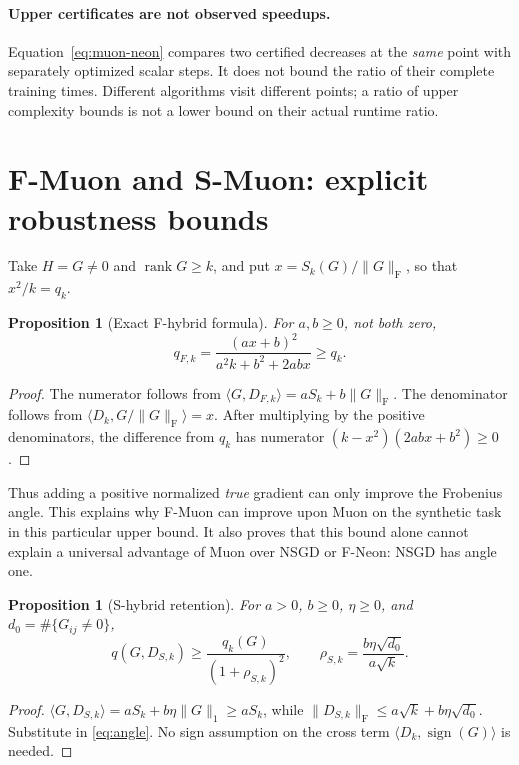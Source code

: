 \documentclass[11pt]{article}
\newtheorem{proposition}[theorem]{Proposition}
\newcommand{\ip}[2]{\langle #1,#2\rangle}
\newcommand{\F}[1]{\lVert #1\rVert_{\mathrm F}}
\newcommand{\ent}[1]{\lVert #1\rVert_1}
\newcommand{\sgn}{\operatorname{sign}}
\newcommand{\rank}{\operatorname{rank}}
\begin{document}
\paragraph{Upper certificates are not observed speedups.}
Equation~\eqref{eq:muon-neon} compares two certified decreases at the
\emph{same} point with separately optimized scalar steps. It does not bound
the ratio of their complete training times. Different algorithms visit
different points; a ratio of upper complexity bounds is not a lower bound
on their actual runtime ratio.

\section{F-Muon and S-Muon: explicit robustness bounds}

Take $H=G\ne0$ and $\rank G\geq k$, and put
$x=S_k(G)/\F G$, so that $x^2/k=q_k$.

\begin{proposition}[Exact F-hybrid formula]\label{prop:f}
For $a,b\geq0$, not both zero,
\begin{equation}\label{eq:fq}
 q_{F,k}=
 \frac{(ax+b)^2}{a^2k+b^2+2abx}\geq q_k.
\end{equation}
\end{proposition}
\begin{proof}
The numerator follows from $\ip{G}{D_{F,k}}=aS_k+b\F G$.
The denominator follows from
$\ip{D_k}{G/\F G}=x$.
After multiplying by the positive denominators, the difference from $q_k$
has numerator $(k-x^2)(2abx+b^2)\geq0$.
\end{proof}
Thus adding a positive normalized \emph{true} gradient can only improve the
Frobenius angle. This explains why F-Muon can improve upon Muon on the
synthetic task in this particular upper bound. It also proves that this
bound alone cannot explain a universal advantage of Muon over NSGD or
F-Neon: NSGD has angle one.

\begin{proposition}[S-hybrid retention]\label{prop:s}
For $a>0$, $b\geq0$, $\eta\geq0$, and $d_0=\#\{G_{ij}\ne0\}$,
\begin{equation}\label{eq:sq}
 q(G,D_{S,k})\geq
 \frac{q_k(G)}{(1+\rho_{S,k})^2},\qquad
 \rho_{S,k}=\frac{b\eta\sqrt{d_0}}{a\sqrt k}.
\end{equation}
\end{proposition}
\begin{proof}
$\ip{G}{D_{S,k}}=aS_k+b\eta\ent G\geq aS_k$, while
$\F{D_{S,k}}\leq a\sqrt k+b\eta\sqrt{d_0}$. Substitute in
\eqref{eq:angle}. No sign assumption on the cross term
$\ip{D_k}{\sgn(G)}$ is needed.
\end{proof}
\end{document}
